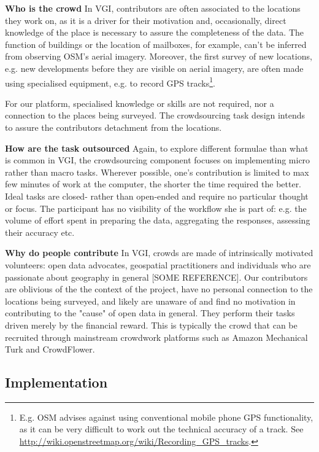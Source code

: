 \textbf{Who is the crowd} In VGI, contributors are often associated to the locations they work on, as it is a driver for their motivation and, occasionally, direct knowledge of the place is necessary to assure the completeness of the data. The function of buildings or the location of mailboxes, for example, can't be inferred from observing OSM's aerial imagery. Moreover, the first survey of new locations, e.g. new developments before they are visible on aerial imagery, are often made using specialised equipment, e.g. to record GPS tracks\footnote{E.g. OSM advises against using conventional mobile phone GPS functionality, as it can be very difficult to work out the technical accuracy of a track. See \url{http://wiki.openstreetmap.org/wiki/Recording_GPS_tracks}.}.

For our platform, specialised knowledge or skills are not required, nor a connection to the places being surveyed. The crowdsourcing task design intends to assure the contributors detachment from the locations.

\textbf{How are the task outsourced} Again, to explore different formulae than what is common in VGI, the crowdsourcing component focuses on implementing micro rather than macro tasks. Wherever possible, one's contribution is limited to max few minutes of work at the computer, the shorter the time required the better. Ideal tasks are closed- rather than open-ended and require no particular thought or focus. The participant has no visibility of the workflow she is part of: e.g. the volume of effort spent in preparing the data, aggregating the responses, assessing their accuracy etc. 

\textbf{Why do people contribute} In VGI, crowds are made of intrinsically motivated volunteers: open data advocates, geospatial practitioners and individuals who are passionate about geography in general [SOME REFERENCE]. Our contributors are oblivious of the the context of the project, have no personal connection to the locations being surveyed, and likely are unaware of and find no motivation in contributing to the "cause" of open data in general. They perform their tasks driven merely by the financial reward. This is typically the crowd that can be recruited through mainstream crowdwork platforms such as Amazon Mechanical Turk and CrowdFlower. 

\subsection{Implementation}

